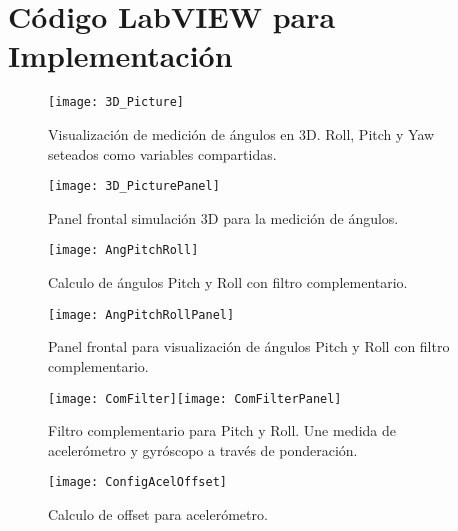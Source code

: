 \documentclass[../main.tex]{subfiles}
\begin{document}
\section*{Código LabVIEW para Implementación}
\begin{landscape}

\begin{figure}
\begin{centering}
\texttt{[image: 3D\_Picture]}
\par\end{centering}
\caption{Visualización de medición de ángulos en 3D. Roll, Pitch y Yaw seteados
como variables compartidas.}
\end{figure}

\begin{figure}
\begin{centering}
\texttt{[image: 3D\_PicturePanel]}
\par\end{centering}
\caption{Panel frontal simulación 3D para la medición de ángulos.}
\end{figure}

\begin{figure}
\begin{centering}
\texttt{[image: AngPitchRoll]}
\par\end{centering}
\caption{Calculo de ángulos Pitch y Roll con filtro complementario.}
\end{figure}

\begin{figure}
\begin{centering}
\texttt{[image: AngPitchRollPanel]}
\par\end{centering}
\caption{Panel frontal para visualización de ángulos Pitch y Roll con filtro
complementario.}
\end{figure}

\begin{figure}
\begin{centering}
\texttt{[image: ComFilter]}\texttt{[image: ComFilterPanel]}
\par\end{centering}
\caption{Filtro complementario para Pitch y Roll. Une medida de acelerómetro
y gyróscopo a través de ponderación.}
\end{figure}

\begin{figure}
\begin{raggedright}
\texttt{[image: ConfigAcelOffset]}
\par\end{raggedright}
\caption{Calculo de offset para acelerómetro.}
\end{figure}


\end{landscape}
\end{document}
